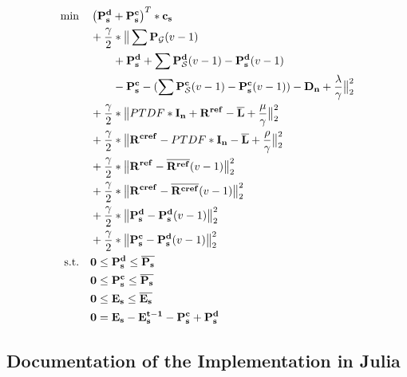  \begin{subequations}
	\begin{align}
		 \min \quad & \left(\vb{P_s^d} + \vb{P_s^c}\right)^T * \vb{c_s}\\
		 & + \frac{\gamma}{2} * \big\| \sum \vb{P_\mathcal{G}}(v-1) \nonumber \\ 
		 & \qquad + \vb{P_s^d} + \sum \vb{P_\mathcal{S}^d}(v-1) - \vb{P_s^d}(v-1) \nonumber \\
		 & \qquad - \vb{P_s^c} - (\sum \vb{P_\mathcal{S}^c}(v-1) -  \vb{P_s^c}(v-1)) - \vb{D_n} + \frac{\vb{\lambda}}{\gamma} \big\|^2_2 \nonumber \\
		 & + \frac{\gamma}{2} * \big\| PTDF * \vb{I_n} + \vb{R^{ref}} - \vb{\overline{L}} + \frac{\vb{\mu}}{\gamma}\big\|^2_2 \nonumber \\
		 & + \frac{\gamma}{2} * \big\| \vb{R^{cref}} - PTDF * \vb{I_n} - \vb{\overline{L}} + \frac{\vb{\rho}}{\gamma}\big\|^2_2 \nonumber \\
		 & + \frac{\gamma}{2} * \big\| \vb{R^{ref}} - \vb{\overline{R^{ref}}}(v-1)  \big\|^2_2 \nonumber\\
		 & + \frac{\gamma}{2} * \big\| \vb{R^{cref}} - \vb{\overline{R^{cref}}}(v-1) \big\|^2_2 \nonumber \\
		 & + \frac{\gamma}{2} * \big\| \vb{P_s^d} - \vb{P_s^d}(v-1)\big\|^2_2 \nonumber \\
		 & + \frac{\gamma}{2} * \big\| \vb{P_s^c} - \vb{P_s^d}(v-1)\big\|^2_2 \nonumber \\
		 \text{s.t.} \quad & \vb{0} \leq \vb{P_s^d} \leq \vb{\overline{P_s}} \\
		 & \vb{0} \leq \vb{P_s^c} \leq \vb{\overline{P_s}} \\
		 & \vb{0} \leq \vb{E_s} \leq \vb{\overline{E_s}}\\
		 & \vb{0} = \vb{E_s} - \vb{E_s^{t-1}} - \vb{P_s^c} + \vb{P_s^d}
	\end{align}
\end{subequations}


\subsection{Documentation of the Implementation in Julia}

